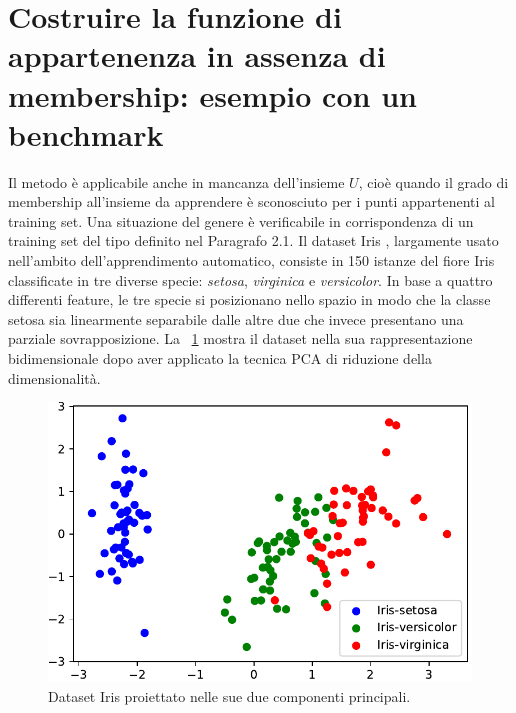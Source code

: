 \documentclass [11pt,a4paper,twoside,openright] {book}
\begin{document}
\section{Costruire la funzione di appartenenza in assenza di membership: esempio con un benchmark}
Il metodo è applicabile anche in mancanza dell'insieme $U$, cioè quando il grado di membership all'insieme da apprendere è sconosciuto per i punti appartenenti al training set. Una situazione del genere è verificabile in corrispondenza di un training set del tipo definito nel Paragrafo 2.1. Il dataset Iris \cite{fisher1936use}, largamente usato nell'ambito dell'apprendimento automatico, consiste in 150 istanze del fiore Iris classificate in tre diverse specie: \textit{setosa}, \textit{virginica} e \textit{versicolor}. In base a quattro differenti feature, le tre specie si posizionano nello spazio in modo che la classe setosa sia linearmente separabile dalle altre due che invece presentano una parziale sovrapposizione. La \figurename~\ref{datasetiris} mostra il dataset nella sua rappresentazione bidimensionale dopo aver applicato la tecnica PCA \cite{abdi2010principal} di riduzione della dimensionalità.
\begin{figure}[!bt]
\centering
\includegraphics[scale=0.6]{figure/datasetiris.pdf}
\caption{Dataset Iris proiettato nelle sue due componenti principali. \label{datasetiris}}
\end{figure}
\end{document}
